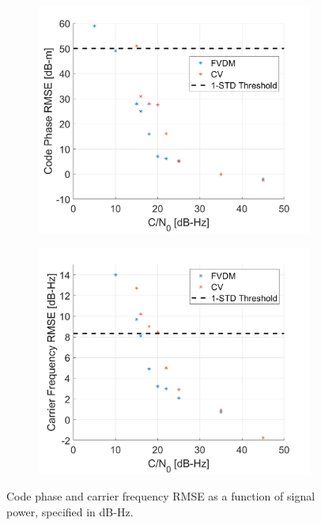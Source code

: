 \begin{figure}[!ht]
    \begin{subfigure}{.45\textwidth}
        \centering
        \includegraphics[width=1\linewidth]{Figures/straight/codephaseRMSEstraight.png}
    \end{subfigure}%
    \begin{subfigure}{.45\textwidth}
        \centering
        \includegraphics[width=1\linewidth]{Figures/straight/carrFreqRMSEstraight.png}
    \end{subfigure}
    \caption{Code phase and carrier frequency RMSE as a function of signal power, specified in dB-Hz.}\label{fig:codecarrierstraight}
\end{figure}

